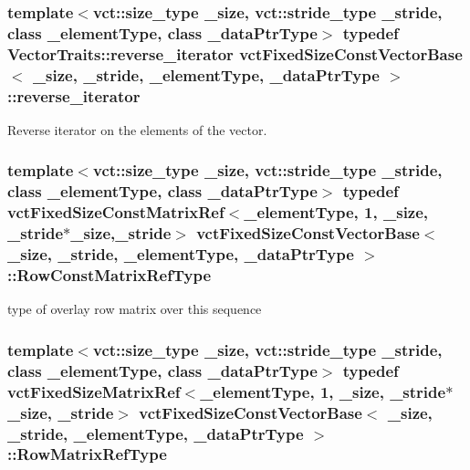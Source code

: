 \subsubsection[{reverse\+\_\+iterator}]{\setlength{\rightskip}{0pt plus 5cm}template$<$vct\+::size\+\_\+type \+\_\+size, vct\+::stride\+\_\+type \+\_\+stride, class \+\_\+element\+Type, class \+\_\+data\+Ptr\+Type$>$ typedef {\bf Vector\+Traits\+::reverse\+\_\+iterator} {\bf vct\+Fixed\+Size\+Const\+Vector\+Base}$<$ \+\_\+size, \+\_\+stride, \+\_\+element\+Type, \+\_\+data\+Ptr\+Type $>$\+::{\bf reverse\+\_\+iterator}}\label{classvct_fixed_size_const_vector_base_ae22e8ced509e202d00620f384ac3a5b2}
Reverse iterator on the elements of the vector. \hypertarget{classvct_fixed_size_const_vector_base_ab7c118dbf79db9194157ced0e4549814}{}
\subsubsection[{Row\+Const\+Matrix\+Ref\+Type}]{\setlength{\rightskip}{0pt plus 5cm}template$<$vct\+::size\+\_\+type \+\_\+size, vct\+::stride\+\_\+type \+\_\+stride, class \+\_\+element\+Type, class \+\_\+data\+Ptr\+Type$>$ typedef {\bf vct\+Fixed\+Size\+Const\+Matrix\+Ref}$<$\+\_\+element\+Type, 1, \+\_\+size, \+\_\+stride$\ast$\+\_\+size,\+\_\+stride$>$ {\bf vct\+Fixed\+Size\+Const\+Vector\+Base}$<$ \+\_\+size, \+\_\+stride, \+\_\+element\+Type, \+\_\+data\+Ptr\+Type $>$\+::{\bf Row\+Const\+Matrix\+Ref\+Type}}\label{classvct_fixed_size_const_vector_base_ab7c118dbf79db9194157ced0e4549814}
type of overlay row matrix over this sequence \hypertarget{classvct_fixed_size_const_vector_base_a1f9ff7c6b2b3f98c51d1bf3eefdfbd32}{}
\subsubsection[{Row\+Matrix\+Ref\+Type}]{\setlength{\rightskip}{0pt plus 5cm}template$<$vct\+::size\+\_\+type \+\_\+size, vct\+::stride\+\_\+type \+\_\+stride, class \+\_\+element\+Type, class \+\_\+data\+Ptr\+Type$>$ typedef {\bf vct\+Fixed\+Size\+Matrix\+Ref}$<$\+\_\+element\+Type, 1, \+\_\+size, \+\_\+stride$\ast$\+\_\+size, \+\_\+stride$>$ {\bf vct\+Fixed\+Size\+Const\+Vector\+Base}$<$ \+\_\+size, \+\_\+stride, \+\_\+element\+Type, \+\_\+data\+Ptr\+Type $>$\+::{\bf Row\+Matrix\+Ref\+Type}}\label{classvct_fixed_size_const_vector_base_a1f9ff7c6b2b3f98c51d1bf3eefdfbd32}
\hypertarget{classvct_fixed_size_const_vector_base_a071063bc4fa43112cc287b2dbef53180}{}
